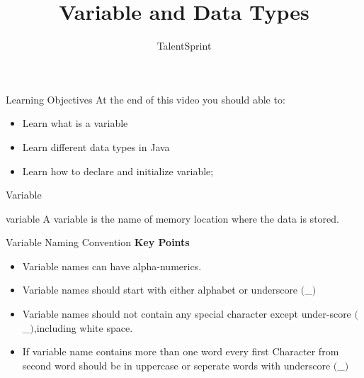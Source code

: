 \documentclass[aspectratio=169,14pt,usenames,dvipsnames]{beamer}
\title[Variable and Data Types]{Variable and Data Types}
\begin{document}
{\1
\begin{frame} \vspace{35pt}

\subtitle{TalentSprint}
\maketitle
\end{frame}
}


\begin{frame}{Learning Objectives}
At the end of this video you should able to:
\begin{itemize}
\item Learn what is a variable
\item Learn different data types in Java
\item Learn how to declare and initialize variable;
\end{itemize}
\end{frame}

\begin{frame}{Variable}
\begin{block}{variable}
A variable is the name of memory location where the data is stored.
\end{block}
\end{frame}


\begin{frame}{Variable Naming Convention}
\textbf{Key Points}
\begin{itemize}
\item Variable names can have alpha-numerics.
\item Variable names should start with either alphabet or underscore $($\_$)$
\item Variable names should not contain any special character except under-score $($\_$)$,including white space.
\item If variable name contains more than one word every first Character from second word should be in uppercase or seperate words with underscore $($\_$)$
\end{itemize}
\end{frame}
\end{document}
